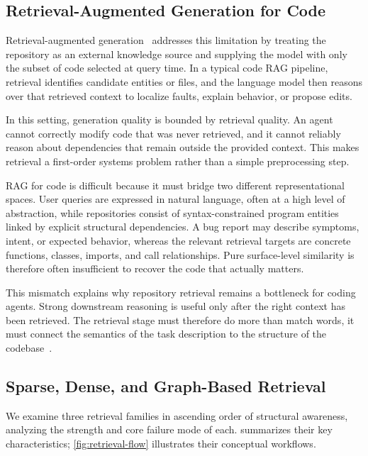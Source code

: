 \subsection{Retrieval-Augmented Generation for Code}
\label{sec:rag}

Retrieval-augmented generation~\cite{lewis2020rag} addresses this limitation by treating the repository as an external knowledge source and supplying the model with only the subset of code selected at query time. In a typical code RAG pipeline, retrieval identifies candidate entities or files, and the language model then reasons over that retrieved context to localize faults, explain behavior, or propose edits.

In this setting, generation quality is bounded by retrieval quality. An agent cannot correctly modify code that was never retrieved, and it cannot reliably reason about dependencies that remain outside the provided context. This makes retrieval a first-order systems problem rather than a simple preprocessing step.

RAG for code is difficult because it must bridge two different representational spaces. User queries are expressed in natural language, often at a high level of abstraction, while repositories consist of syntax-constrained program entities linked by explicit structural dependencies. A bug report may describe symptoms, intent, or expected behavior, whereas the relevant retrieval targets are concrete functions, classes, imports, and call relationships. Pure surface-level similarity is therefore often insufficient to recover the code that actually matters.

This mismatch explains why repository retrieval remains a bottleneck for coding agents. Strong downstream reasoning is useful only after the right context has been retrieved. The retrieval stage must therefore do more than match words, it must connect the semantics of the task description to the structure of the codebase~\cite{yang2024swebench}.

\subsection{Sparse, Dense, and Graph-Based Retrieval}
\label{sec:retrieval-families}

We examine three retrieval families in ascending order of structural awareness, analyzing the strength and core failure mode of each.  summarizes their key characteristics; \cref{fig:retrieval-flow} illustrates their conceptual workflows.

